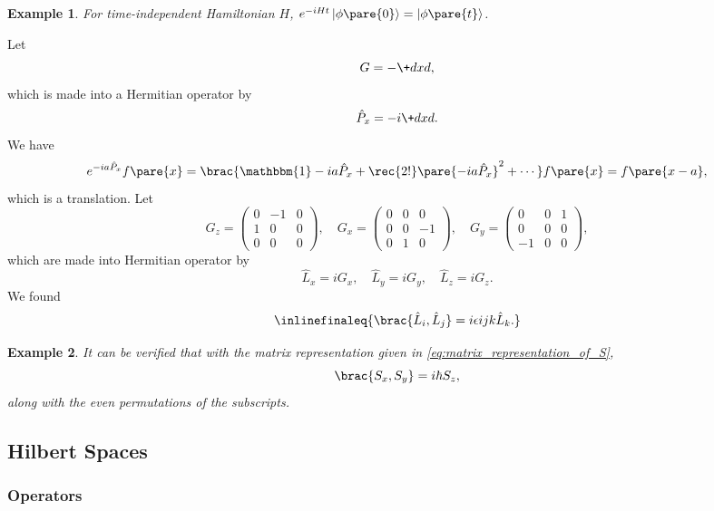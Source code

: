 \documentclass[hidelinks]{article}
\newtheorem{example}{Example}
\begin{document}
\begin{example}
    For time-independent Hamiltonian $H$, $e^{-iHt}\ket{\phi\pare{0}} = \ket{\phi\pare{t}}$.
\end{example}
Let
\[ G = -\+dxd{}, \]
which is made into a Hermitian operator by
\[ \hat P_x = -i\+dxd{}. \]
We have
\[ e^{-ia\hat P_x}f\pare{x} = \brac{\mathbbm{1} - ia\hat P_x + \rec{2!}\pare{-ia\hat P_x}^2 + \cdots} f\pare{x} = f\pare{x-a}, \]
which is a translation.
Let
\[ G_z = \begin{pmatrix}
    0 & -1 & 0 \\
    1 & 0 & 0 \\
    0 & 0 & 0
\end{pmatrix},\quad G_x = \begin{pmatrix}
    0 & 0 & 0 \\
    0 & 0 & -1 \\
    0 & 1 & 0
\end{pmatrix},\quad G_y = \begin{pmatrix}
    0 & 0 & 1 \\
    0 & 0 & 0 \\
    -1 & 0 & 0
\end{pmatrix}, \]
which are made into Hermitian operator by
\[ \hat L_x = iG_x,\quad \hat L_y = iG_y,\quad \hat L_z = iG_z. \]
We found
\[ \inlinefinaleq{\brac{\hat L_i,\hat L_j} = i\epsilon{ijk}\hat L_k.} \]
\begin{sample}
    \begin{example}
        It can be verified that with the matrix representation given in \eqref{eq:matrix_representation_of_S},
        \[ \brac{S_x,S_y} = i\hbar S_z, \]
        along with the even permutations of the subscripts.
    \end{example}
\end{sample}


\subsection{Hilbert Spaces} %
\label{sub:hilbert_spaces}

\subsubsection{Operators} %
\label{ssub:operators}
\end{document}
